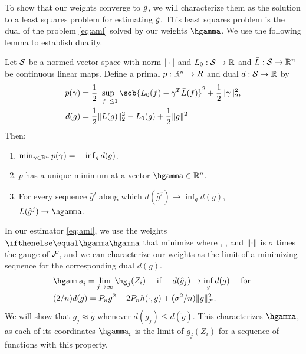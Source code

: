 To show that our weights converge to $\gapprox$, we will characterize them as the solution to a least squares problem for estimating $\gapprox$.
This least squares problem is the dual of the problem \eqref{eq:aml} solved by our weights $\hgamma$.
We use the following lemma to establish duality.
\begin{lemm}
\label{lemma:duality}
Let $\S$ be a normed vector space with norm $\norm{\cdot}$   
and $L_0:\S \to \R$ and $\bar L:\S \to \R^n$ be continuous linear maps.
Define a primal $p:\R^n \to R$ and dual $d:\S \to \R$ by
\begin{align*}
p(\gamma) &=  \frac{1}{2}\sup_{\norm{f} \le 1}\sqb{ L_0(f) - \gamma^T \bar L(f)}^2 +\frac{1}{2} \norm{\gamma}_2^2, \\
d(g)      &= \frac{1}{2} \norm{\bar L(g)}_2^2  - L_0(g)  + \frac{1}{2}\norm{g}^2
\end{align*}
Then:
\begin{enumerate}
\item $\min_{\gamma \in \R^n} p(\gamma) = -\inf_{g} d(g)$. 
\item $p$ has a unique minimum at a vector $\hgamma \in \R^n$.
\item For every sequence $\hat g^j$ along which $d(\hat g^j) \to \inf_{g} d(g)$, \\
      $\bar L(\hat g^j) \to \hgamma$.
\end{enumerate}
\end{lemm}
\noindent In our estimator \eqref{eq:aml}, we use the weights $\hriesz$ that minimize 
 where , ,
and $\norm{\cdot}$ is $\sigma$ times the gauge of $\F$, and we can characterize our weights as the limit of a minimizing sequence for the corresponding dual $d(g)$.
\begin{equation}
\label{eq:duality-explicit}
\begin{aligned}  
&\hgamma_i = \lim_{j \to \infty} \hg_j(Z_i) \quad \text{ if } \quad d(\hat g_j) \to \inf_{g}d(g) \quad \text{ for } \\
&(2/n) d(g) = \Pn g^2  - 2\Pn h(\cdot,g)  + (\sigma^2/n)\norm{g}_{\F}^2.
\end{aligned}
\end{equation}
We will show that $g_j \approx \tilde g$ whenever $d(g_j) \le d(\tilde g)$.
This characterizes $\hgamma$, as each of its coordinates $\hgamma_i$ 
is the limit of $g_j(Z_i)$ for a sequence of functions with this property.


